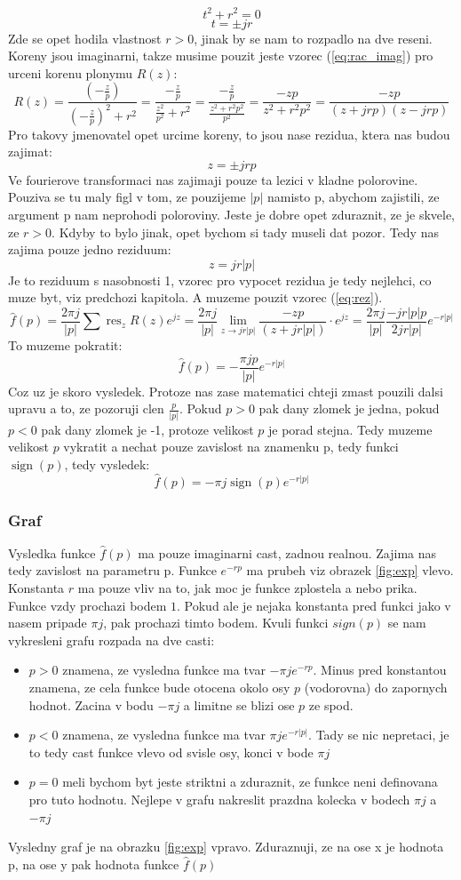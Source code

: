 $$t^2 + r^2 = 0$$
$$t = \pm jr$$
Zde se opet hodila vlastnost $r>0$, jinak by se nam to rozpadlo na dve reseni.
Koreny jsou imaginarni, takze musime pouzit jeste vzorec (\ref{eq:rac_imag}) pro urceni korenu plonymu $R(z)$:
$$R(z) = \frac{\left(-\frac{z}{p}\right)}{\left(-\frac{z}{p}\right)^2 + r^2} = \frac{-\frac{z}{p}}{\frac{z^2}{p^2}+r^2} = \frac{-\frac{z}{p}}{\frac{z^2+r^2 p^2}{p^2}} = \frac{-zp}{z^2+r^2 p^2} = \frac{-zp}{(z+jrp)(z-jrp)}$$
Pro takovy jmenovatel opet urcime koreny, to jsou nase rezidua, ktera nas budou zajimat:
$$z=\pm jrp$$
Ve fourierove transformaci nas zajimaji pouze ta lezici v kladne polorovine. Pouziva se tu maly figl v tom, ze pouzijeme $|p|$ namisto p, abychom zajistili, ze argument p nam neprohodi poloroviny. Jeste je dobre opet zduraznit, ze je skvele, ze $r>0$. Kdyby to bylo jinak, opet bychom si tady museli dat pozor. Tedy nas zajima pouze jedno reziduum:
$$z = jr|p|$$
Je to reziduum s nasobnosti 1, vzorec pro vypocet rezidua je tedy nejlehci, co muze byt, viz predchozi kapitola.
A muzeme pouzit vzorec (\ref{eq:rez}). 
$$\hat{f}(p)= \frac{2 \pi j}{|p|}\sum \operatorname{res}_z R(z)e^{jz} = \frac{2 \pi j}{|p|} \lim_{z \to jr|p|} \frac{-zp}{(z+jr|p|)}\cdot e^{jz} = \frac{2 \pi j}{|p|} \frac{-jr|p|p}{2jr|p|}e^{-r|p|}$$
To muzeme pokratit:
$$\hat{f}(p) = -\frac{\pi j p}{|p|}e^{-r|p|}$$
Coz uz je skoro vysledek. Protoze nas zase matematici chteji zmast pouzili dalsi upravu a to, ze pozoruji clen $\frac{p}{|p|}$. Pokud $p>0$ pak dany zlomek je jedna, pokud $p<0$ pak dany zlomek je -1, protoze velikost $p$ je porad stejna. Tedy muzeme velikost $p$ vykratit a nechat pouze zavislost na znamenku p, tedy funkci $\operatorname{sign}(p)$, tedy vysledek:
$$\hat{f}(p) = -\pi j \operatorname{sign}(p) e^{-r|p|}$$

\subsubsection*{Graf}
Vysledka funkce $\hat{f}(p)$ ma pouze imaginarni cast, zadnou realnou. Zajima nas tedy zavislost na parametru p. Funkce $e^{-rp}$ ma prubeh viz obrazek \ref{fig:exp} vlevo. Konstanta $r$ ma pouze vliv na to, jak moc je funkce zplostela a nebo prika. Funkce vzdy prochazi bodem $1$. Pokud ale je nejaka konstanta pred funkci jako v nasem pripade $\pi j $, pak prochazi timto bodem. Kvuli funkci $sign(p)$ se nam vykresleni grafu rozpada na dve casti:
\begin{itemize}
\item $p>0$ znamena, ze vysledna funkce ma tvar $-\pi j e^{-rp}$. Minus pred konstantou znamena, ze cela funkce bude otocena okolo osy $p$ (vodorovna) do zapornych hodnot. Zacina v bodu $-\pi j$ a limitne se blizi ose $p$ ze spod.
\item $p<0$ znamena, ze vysledna funkce ma tvar $\pi j e^{-r|p|}$. Tady se nic nepretaci, je to tedy cast funkce vlevo od svisle osy, konci v bode $\pi j$
\item $p=0$ meli bychom byt jeste striktni a zduraznit, ze funkce neni definovana pro tuto hodnotu. Nejlepe v grafu nakreslit prazdna kolecka v bodech $\pi j$ a $-\pi j$
\end{itemize}
Vysledny graf je na obrazku \ref{fig:exp} vpravo. Zduraznuji, ze na ose x je hodnota p, na ose y pak hodnota funkce $\hat{f}(p)$

